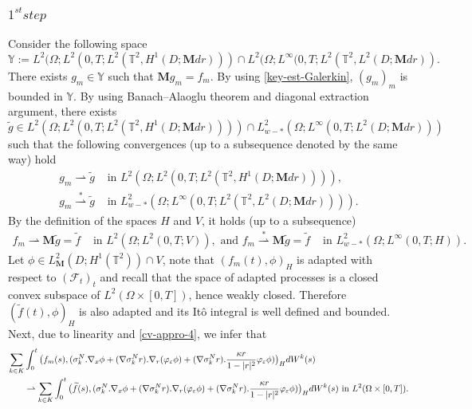 \documentclass[a4paper,12pt, reqno]{amsart}
\begin{document}
	\subsubsection*{$1^{st} step$}
Consider the following space
    $$\mathbb{Y}:=L^2(\Omega ;L^2(0, T;L^2(\mathbb{T}^2,H^1(D;\mathbf{M}dr))) \cap  L^2(\Omega ;L^\infty(0, T;L^2(\mathbb{T}^2,L^2(D;\mathbf{M}dr)).$$
	 There exists $g_m \in \mathbb{Y}$ such that   $\mathbf{M}g_m=f_m.$ By  using   \eqref{key-est-Galerkin}, $(g_m)_m$ is bounded in $\mathbb{Y}.$ By using  Banach–Alaoglu theorem    and  diagonal extraction argument,
     there exists $$\widetilde{g} \in L^2(\Omega ;L^2(0, T;L^2(\mathbb{T}^2,H^1(D;\mathbf{M}dr)))) \cap  L^2_{w-*}(\Omega ;L^\infty(0, T;L^2(D;\mathbf{M}dr)))$$  
 such that the following   convergences  (up to a subsequence denoted by the same way) hold
	\begin{align}
		g_m \rightharpoonup \widetilde{g} &\text{		in	}  L^2(\Omega ;L^2(0, T;L^2(\mathbb{T}^2,H^1(D;\mathbf{M}dr)))),\label{cv-appro-3-g}\\
		g_m \overset{*}{\rightharpoonup} \widetilde{g} &\text{		in	}  L^2_{w-*}(\Omega ;L^\infty(0, T;L^2(\mathbb{T}^2,L^2(D;\mathbf{M}dr)))).\label{cv-appro-4-g}
	\end{align}
     By the definition of the spaces $H$ and $V$,  it holds   (up to a subsequence) 
	\begin{align}
		f_m \rightharpoonup  \mathbf{M}\widetilde{g}=\widetilde{f} &\text{		in	}  L^2(\Omega ;L^2(0, T;V)), \text{ and }
		f_m \overset{*}{\rightharpoonup} \mathbf{M}\widetilde{g}=\widetilde{f} &\text{		in	}  L^2_{w-*}(\Omega ;L^\infty(0, T;H)).\label{cv-appro-4}
	\end{align} Let  $\phi \in L^2_\mathbf{M}(D;H^1(\mathbb{T}^2)) \cap V$, note that    $(f_m(t),\phi)_H$	is adapted with    respect to  $(\mathcal{F}_t)_t$    and recall  that     the space of 
	adapted processes is a closed convex    subspace of $L^2 (\Omega \times [0,T])$, hence weakly
	closed. Therefore  $(\widetilde{f}(t),\phi)_H$ is also adapted  and  its    It\^o   integral    is  well    defined and  bounded. 
    Next, due to  linearity and 
	\eqref{cv-appro-4}, we infer that 
	\begin{align*}
		\sum_{k\in K}&\int_0^t\big(f_m(s),( \sigma_k^N.\nabla_x\phi +(\nabla \sigma_k^Nr).\nabla_r (\varphi_\varepsilon\phi)+(\nabla \sigma_k^Nr).\dfrac{\kappa r}{1-\vert r\vert^2}\varphi_\varepsilon\phi)\big)_HdW^k(s) \\&\rightharpoonup \sum_{k\in K}\int_0^t\big(\widetilde{f}(s),( \sigma_k^N.\nabla_x\phi +(\nabla \sigma_k^Nr).\nabla_r (\varphi_\varepsilon\phi)+(\nabla \sigma_k^Nr).\dfrac{\kappa r}{1-\vert r\vert^2}\varphi_\varepsilon\phi)\big)_HdW^k(s) \text{  in } L^2(\Omega\times [0,T]).\notag
\end{align*}
\end{document}
